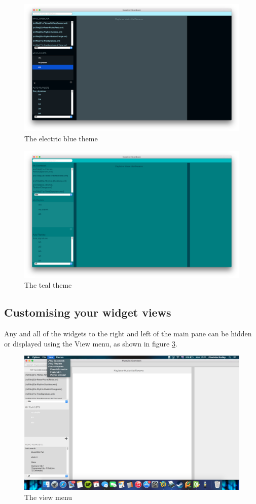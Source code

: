 \begin{figure}[H]
\centering
\includegraphics[width=400pt]{main_electric}
\caption{The electric blue theme}
\label{fig:theme3}	
\end{figure}

\begin{figure}[H]
\centering
\includegraphics[width=400pt]{teal}
\caption{The teal theme}
\label{fig:theme4}	
\end{figure}

\subsection{Customising your widget views}
Any and all of the widgets to the right and left of the main pane can be hidden or displayed using the View menu, as shown in figure \ref{fig:view}.

\begin{figure}[H]
\centering
\includegraphics[width=500pt]{view}
\caption{The view menu}
\label{fig:view}	
\end{figure}


